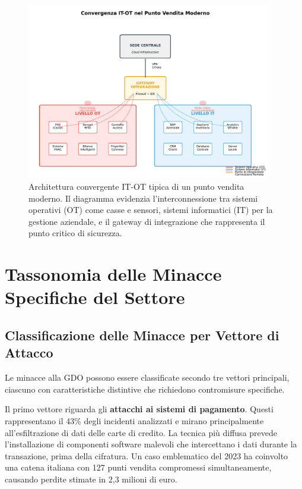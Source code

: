 \begin{figure}[htbp]
\centering
\includegraphics[width=0.95\textwidth]{thesis_figures/cap2/fig_2_2_convergenza_it_ot.pdf}
\caption{Architettura convergente IT-OT tipica di un punto vendita moderno. Il diagramma evidenzia l'interconnessione tra sistemi operativi (OT) come casse e sensori, sistemi informatici (IT) per la gestione aziendale, e il gateway di integrazione che rappresenta il punto critico di sicurezza.}
\label{fig:convergenza_it_ot}
\end{figure}

\section{\texorpdfstring{Tassonomia delle Minacce Specifiche del Settore}{2.3 - Tassonomia delle Minacce Specifiche del Settore}}
\label{sec:cap2_tassonomia}

\subsection{\texorpdfstring{Classificazione delle Minacce per Vettore di Attacco}{2.3.1 - Classificazione delle Minacce per Vettore di Attacco}}
\label{subsec:vettori_attacco}

Le minacce alla GDO possono essere classificate secondo tre vettori principali, ciascuno con caratteristiche distintive che richiedono contromisure specifiche.

Il primo vettore riguarda gli \textbf{attacchi ai sistemi di pagamento}. Questi rappresentano il 43\% degli incidenti analizzati e mirano principalmente all'esfiltrazione di dati delle carte di credito. La tecnica più diffusa prevede l'installazione di componenti software malevoli\autocite{trustwave2024pos} che intercettano i dati durante la transazione, prima della cifratura. Un caso emblematico del 2023 ha coinvolto una catena italiana con 127 punti vendita compromessi simultaneamente, causando perdite stimate in 2,3 milioni di euro.

